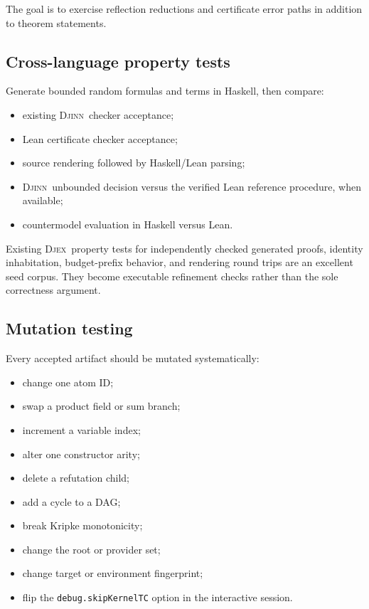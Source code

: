 \documentclass[11pt,letterpaper,openany]{report}
\theoremstyle{definition}
\theoremstyle{remark}
\newcommand{\Djex}{\textsc{Djex}}
\newcommand{\Djinn}{\textsc{Djinn}}
\newcommand{\code}[1]{\texttt{#1}}
\begin{document}
The goal is to exercise reflection reductions and certificate error paths in addition to theorem statements.

\subsection{Cross-language property tests}

Generate bounded random formulas and terms in Haskell, then compare:

\begin{itemize}
\item existing \Djinn\ checker acceptance;
\item Lean certificate checker acceptance;
\item source rendering followed by Haskell/Lean parsing;
\item \Djinn\ unbounded decision versus the verified Lean reference procedure, when available;
\item countermodel evaluation in Haskell versus Lean.
\end{itemize}

Existing \Djex\ property tests for independently checked generated proofs, identity inhabitation, budget-prefix behavior, and rendering round trips are an excellent seed corpus. They become executable refinement checks rather than the sole correctness argument.

\subsection{Mutation testing}

Every accepted artifact should be mutated systematically:

\begin{itemize}
\item change one atom ID;
\item swap a product field or sum branch;
\item increment a variable index;
\item alter one constructor arity;
\item delete a refutation child;
\item add a cycle to a DAG;
\item break Kripke monotonicity;
\item change the root or provider set;
\item change target or environment fingerprint;
\item flip the \code{debug.skipKernelTC} option in the interactive session.
\end{itemize}
\end{document}
